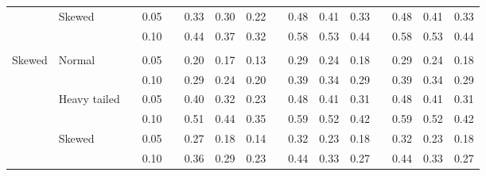 \documentclass[11pt]{article} %
\begin{document}
\begin{table}[ht]
\begin{scriptsize}
\begin{center}
\begin{tabular}{ll p{.1cm} c p{.1cm} rrr p{.1cm} rrr p{.1cm} rrr}
             & Skewed       && 0.05 &&  0.33 & 0.30 & 0.22 && 0.48 & 0.41 & 0.33 && 0.48 & 0.41 & 0.33 \\ 
             &              && 0.10 &&  0.44 & 0.37 & 0.32 && 0.58 & 0.53 & 0.44 && 0.58 & 0.53 & 0.44 \\ 
             &&&&&&&&&&&&&&&\\
Skewed       & Normal       && 0.05 &&  0.20 & 0.17 & 0.13 && 0.29 & 0.24 & 0.18 && 0.29 & 0.24 & 0.18 \\ 
             &              && 0.10 &&  0.29 & 0.24 & 0.20 && 0.39 & 0.34 & 0.29 && 0.39 & 0.34 & 0.29 \\ 
             & Heavy tailed && 0.05 &&  0.40 & 0.32 & 0.23 && 0.48 & 0.41 & 0.31 && 0.48 & 0.41 & 0.31 \\ 
             &              && 0.10 &&  0.51 & 0.44 & 0.35 && 0.59 & 0.52 & 0.42 && 0.59 & 0.52 & 0.42 \\ 
             & Skewed       && 0.05 &&  0.27 & 0.18 & 0.14 && 0.32 & 0.23 & 0.18 && 0.32 & 0.23 & 0.18 \\ 
             &              && 0.10 &&  0.36 & 0.29 & 0.23 && 0.44 & 0.33 & 0.27 && 0.44 & 0.33 & 0.27 \\ 



\end{tabular}
\end{center}
\end{scriptsize}
\end{table}
\end{document}
